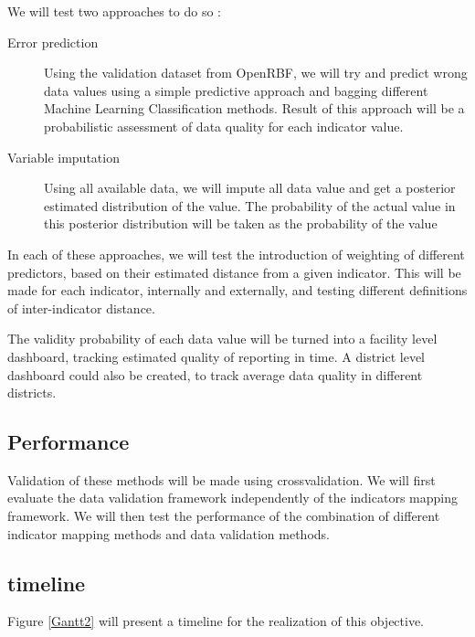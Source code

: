 \documentclass[a4paper,11pt,draft,twoside]{article}
\begin{document}

We will test two approaches to do so :

\begin{description}
\item[Error prediction] Using the validation dataset from OpenRBF, we will try and predict wrong data values using a simple predictive approach and bagging different Machine Learning Classification methods. Result of this approach will be a probabilistic assessment of data quality for each indicator value.
\item[Variable imputation] Using all available data, we will impute all data value and get a posterior estimated distribution of the value. The probability of the actual value in this posterior distribution will be taken as the probability of the value
\end{description}

In each of these approaches, we will test the introduction of weighting of different predictors, based on their estimated distance from a given indicator. This will be made for each indicator, internally and externally, and testing different definitions of inter-indicator distance.

The validity probability of each data value will be turned into a facility level dashboard, tracking estimated quality of reporting in time. A district level dashboard could also be created, to track average data quality in different districts.

\subsection{Performance}

Validation of these methods will be made using crossvalidation. We will first evaluate the data validation framework independently of the indicators mapping framework. We will then test the performance of the combination of different indicator mapping methods and data validation methods.

\subsection{timeline}

Figure \ref{Gantt2} will present a timeline for the realization of this objective.
\end{document}
